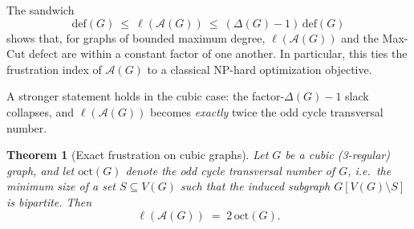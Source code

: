 \documentclass[11pt]{article}
\newtheorem{theorem}{Theorem}
\theoremstyle{plain}
\begin{document}
\medskip

The sandwich
\[
\mathrm{def}(G)\ \le\ \ell(\mathcal A(G))\ \le\ (\Delta(G)-1)\,\mathrm{def}(G)
\]
shows that, for graphs of bounded maximum degree, $\ell(\mathcal A(G))$ and the Max-Cut
defect are within a constant factor of one another. In particular, this ties the frustration
index of $\mathcal A(G)$ to a classical NP-hard optimization objective.

A stronger statement holds in the cubic case: the factor-$\Delta(G)-1$ slack collapses,
and $\ell(\mathcal A(G))$ becomes \emph{exactly} twice the odd cycle transversal number.

\begin{theorem}[Exact frustration on cubic graphs]\label{thm:cubic-oct}
Let $G$ be a cubic (3-regular) graph, and let $\mathrm{oct}(G)$ denote the \emph{odd cycle
transversal number} of $G$, i.e.\ the minimum size of a set $S\subseteq V(G)$ such that the
induced subgraph $G[V(G)\setminus S]$ is bipartite. Then
\[
\ell(\mathcal A(G)) \;=\; 2\,\mathrm{oct}(G).
\]
\end{theorem}
\end{document}
